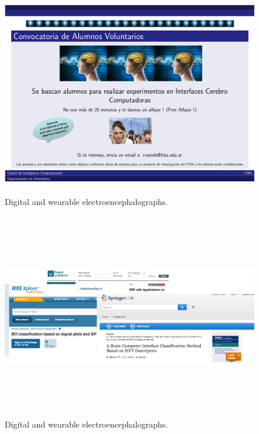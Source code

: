 \documentclass[aspectratio=169]{beamer}
\begin{document}
\begin{frame}   
\begin{figure}[]
\centering
\includegraphics[height=9cm,width=1\textwidth]{images/Convocatoria.png}
\caption[Wearable portable Digital Electroencephalograph]{Digital and wearable electroencephalographs.}
\label{fig:digitalelectroencephalograph}
\end{figure}
\end{frame}  

\begin{frame}   
\begin{figure}[]
\centering
\includegraphics[height=9cm,width=1\textwidth]{images/Papers.png}
\caption[Wearable portable Digital Electroencephalograph]{Digital and wearable electroencephalographs.}
\label{fig:digitalelectroencephalograph}
\end{figure}
\end{frame}  
\end{document}
